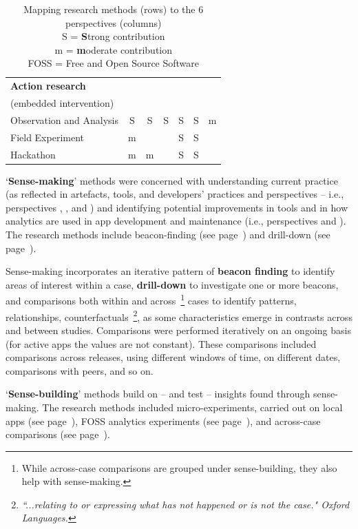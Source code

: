 \begin{table}
\begin{tabular}{l|ccc|ccc}
        \hline
        \textbf{Action research} & & & & & & \\
        (embedded intervention)  & & & & & &  \\
        Observation and Analysis &S &S &S &S &S &m \\
        Field Experiment         &m &  &  &S &S &  \\
        Hackathon                &m &m &  &S &S &  \\
        
        \bottomrule
    \end{tabular}
    \caption[Mapping research methods (rows) to the 6 perspectives (columns)]{Mapping research methods (rows) to the 6 perspectives (columns) \\ S = \textbf{S}trong contribution \\ m = \textbf{m}oderate contribution \\FOSS = Free and Open Source Software}
    \label{tab:mapping-analysis-to-six-perspectives}
\end{table}

`\textbf{Sense-making}' methods were concerned with understanding current practice (as reflected in artefacts, tools, and developers' practices and perspectives -- i.e., perspectives \uartefacts, \utools, and \uuse) and identifying potential improvements in tools and in how analytics are used in app development and maintenance (i.e., perspectives \itools and \iartefacts). The research methods include beacon-finding (see page~\pageref{section-beacon-finding-method}) and drill-down (see page~\pageref{drill-down-research-method}).

Sense-making incorporates an iterative pattern of \textbf{beacon finding} to identify areas of interest within a case, \textbf{drill-down} to investigate one or more beacons, and comparisons both within and across~\footnote{While across-case comparisons are grouped under sense-building, they also help with sense-making.} cases to identify patterns, relationships, counterfactuals~\footnote{\emph{``...relating to or expressing what has not happened or is not the case." Oxford Languages.}}, as some characteristics emerge in contrasts across and between studies. Comparisons were performed iteratively on an ongoing basis (for active apps the values are not constant). These comparisons included comparisons across releases, using different windows of time, on different dates, comparisons with peers, and so on.


`\textbf{Sense-building}' methods build on -- and test -- insights found through sense-making. The research methods included micro-experiments, carried out on local apps (see page~\pageref{local-app-experiments-research-method}), FOSS analytics experiments %
(see page~\pageref{foss-contributions-research-methods}), and across-case comparisons (see page~\pageref{across-case-comparisons-research-method}).

